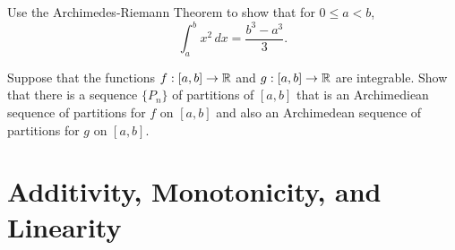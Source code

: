 \documentclass[letterpaper, twoside, 12pt]{book}
\begin{document}
\begin{exercise}[6b]
  Use the Archimedes-Riemann Theorem to show that for \(0\leq a<b\),
  \[
    \int_a^b x^2\,dx = \frac{b^3-a^3}{3}
  .\]
\end{exercise}
\begin{solution}

\end{solution}


\begin{exercise}[9]
  Suppose that the functions \(f:[a,b]\to\mathbb R\) and
  \(g:[a,b]\to\mathbb R\) are integrable. Show that there is a sequence
  \(\{P_n\}\) of partitions of \([a,b]\) that is an Archimediean sequence
  of partitions for \(f\) on \([a,b]\) and also an Archimedean sequence
  of partitions for \(g\) on \([a,b]\).
\end{exercise}
\begin{solution}

\end{solution}


\section{Additivity, Monotonicity, and Linearity}



\end{document}
